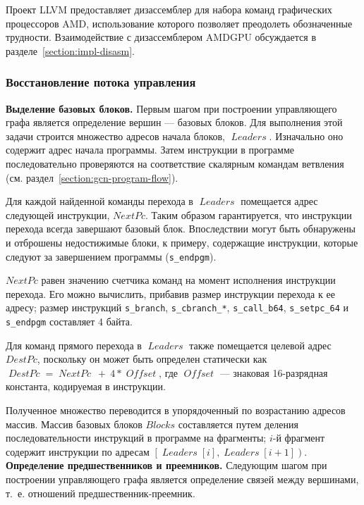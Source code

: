 \documentclass[a4paper,14pt]{extarticle}
\newcommand{\topic}[1]{\textbf{#1.}}
\newcommand{\var}[1]{\mathop{\mathit{#1}}}
\begin{document}
{Проект LLVM предоставляет дизассемблер для набора команд графических процессоров AMD,
использование которого позволяет преодолеть обозначенные трудности. Взаимодействие с
дизассемблером AMDGPU обсуждается в разделе~\ref{section:impl-disasm}.

\subsubsection{Восстановление потока управления}

\topic{Выделение базовых блоков} Первым шагом при построении управляющего графа
является определение вершин — базовых блоков. Для выполнения этой задачи
строится множество адресов начала блоков, $\var{Leaders}$. Изначально
оно содержит адрес начала программы. Затем инструкции в программе
последовательно проверяются на соответствие скалярным командам ветвления
(см. раздел~\ref{section:gcn-program-flow}).

Для каждой найденной команды перехода в $\var{Leaders}$ помещается адрес следующей инструкции,
$NextPc$. Таким образом гарантируется, что инструкции перехода всегда завершают базовый
блок. Впоследствии могут быть обнаружены и отброшены недостижимые блоки, к примеру,
содержащие инструкции, которые следуют за завершением программы (\verb|s_endpgm|).

$NextPc$ равен значению счетчика команд на момент исполнения инструкции перехода.
Его можно вычислить, прибавив размер инструкции перехода к ее адресу; размер инструкций
\verb|s_branch|, \verb|s_cbranch_*|, \verb|s_call_b64|, \verb|s_setpc_64|
и \verb|s_endpgm| составляет 4 байта.

Для команд прямого перехода в $\var{Leaders}$ также помещается целевой адрес $DestPc$,
поскольку он может быть определен статически как $\var{DestPc} = \var{NextPc}\ +\ 4*\var{Offset}$,
где $\var{Offset}$ — знаковая 16-разрядная константа, кодируемая в инструкции.

Полученное множество переводится в упорядоченный по возрастанию адресов массив.
Массив базовых блоков $Blocks$ составляется путем деления последовательности инструкций
в программе на фрагменты; $i$-й фрагмент содержит инструкции по адресам
$\left[\var{Leaders}[i], \var{Leaders}[i+1]\right)$.\\

\topic{Определение предшественников и преемников} Следующим шагом при построении
управляющего графа является определение связей между вершинами, т.~е. отношений
предшественник-преемник.

}
\end{document}
